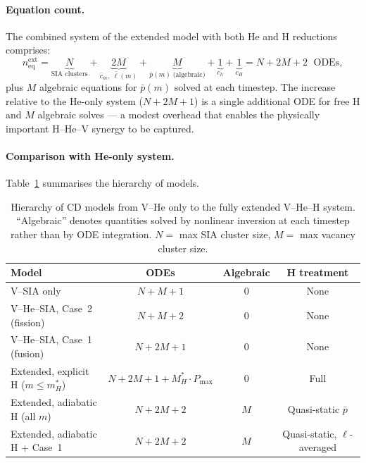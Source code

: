 \paragraph{Equation count.}
The combined system of the extended model with both He and H reductions
comprises:
\begin{equation}\label{eq:neq_extended}
    n_{\mathrm{eq}}^{\mathrm{ext}}
    = \underbrace{N}_{\text{SIA clusters}}
    + \underbrace{2M}_{\bar{c}_m,\;\bar{\ell}(m)}
    + \underbrace{M}_{\bar{p}(m)\;\text{(algebraic)}}
    + \underbrace{1}_{c_h}
    + \underbrace{1}_{c_H}
    = N + 2M + 2\;\text{ ODEs},
\end{equation}
plus $M$ algebraic equations for $\bar{p}(m)$ solved at each timestep.
The increase relative to the He-only system ($N + 2M + 1$) is a single
additional ODE for free H and $M$ algebraic solves --- a modest overhead
that enables the physically important H--He--V synergy to be captured.

\paragraph{Comparison with He-only system.}
Table~\ref{tab:extended_comparison} summarises the hierarchy of models.

\begin{table}[htbp]
\centering
\caption{Hierarchy of CD models from V--He only to the fully extended
V--He--H system.  ``Algebraic'' denotes quantities solved by nonlinear
inversion at each timestep rather than by ODE integration.
$N = $ max SIA cluster size, $M = $ max vacancy cluster size.}
\label{tab:extended_comparison}
\renewcommand{\arraystretch}{1.3}
\begin{tabular}{@{}p{5cm}ccc@{}}
\toprule
\textbf{Model} & \textbf{ODEs} & \textbf{Algebraic} & \textbf{H treatment} \\
\midrule
V--SIA only              & $N + M + 1$  & 0 & None \\
V--He--SIA, Case~2 (fission) & $N + M + 2$  & 0 & None \\
V--He--SIA, Case~1 (fusion)  & $N + 2M + 1$ & 0 & None \\
Extended, explicit H ($m \leq m_H^*$) & $N + 2M + 1 + M_H^*\cdot P_{\max}$ & 0 & Full \\
Extended, adiabatic H (all $m$)       & $N + 2M + 2$ & $M$ & Quasi-static $\bar{p}$ \\
Extended, adiabatic H + Case~1        & $N + 2M + 2$ & $M$ & Quasi-static, $\ell$-averaged \\
\bottomrule
\end{tabular}
\end{table}

